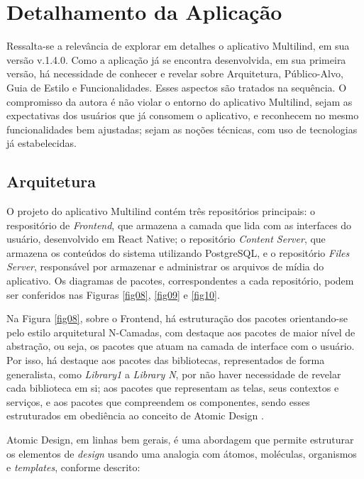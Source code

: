\section{Detalhamento da Aplicação}
\label{sec:Detalhamento da Aplicacao}
Ressalta-se a relevância de explorar em detalhes o aplicativo Multilind, em sua versão v.1.4.0. Como a aplicação já se encontra desenvolvida, em sua primeira versão, há necessidade de conhecer e revelar sobre Arquitetura, Público-Alvo, Guia de Estilo e Funcionalidades. Esses aspectos são 
tratados na sequência. O compromisso da autora é não violar o entorno do aplicativo Multilind, sejam as expectativas dos usuários que já consomem o aplicativo, e reconhecem no mesmo funcionalidades bem ajustadas; sejam as noções técnicas, com uso de tecnologias já estabelecidas.

\subsection{Arquitetura}
\label{Arquitetura}
O projeto do aplicativo Multilind contém três repositórios principais: o respositório de \textit{Frontend}, que armazena a camada que lida com as interfaces do usuário, desenvolvido em React Native; o repositório \textit{Content Server}, que armazena os conteúdos do sistema 
utilizando PostgreSQL, e o repositório \textit{Files Server}, responsável por armazenar e administrar os arquivos de mídia do aplicativo. Os diagramas de  pacotes, correspondentes a cada repositório, podem ser conferidos nas Figuras \ref{fig08}, \ref{fig09} e \ref{fig10}. 

Na Figura \ref{fig08}, sobre o Frontend, há estruturação dos pacotes orientando-se pelo estilo arquitetural N-Camadas, com destaque aos pacotes de maior nível de abstração, ou seja, os pacotes que atuam na camada de interface com o usuário. Por isso, há destaque aos pacotes das bibliotecas, representados de forma generalista, 
como \textit{Library1} a \textit{Library N}, por não haver necessidade de revelar cada biblioteca em si; aos pacotes que representam as telas, seus contextos e serviços, e aos pacotes que compreendem os componentes, sendo esses estruturados em obediência ao conceito de Atomic Design \cite{atomic}. 

Atomic Design, em linhas bem gerais, é uma abordagem que permite estruturar os elementos de \textit{design} usando uma analogia com átomos, moléculas, organismos e \textit{templates}, conforme descrito:

